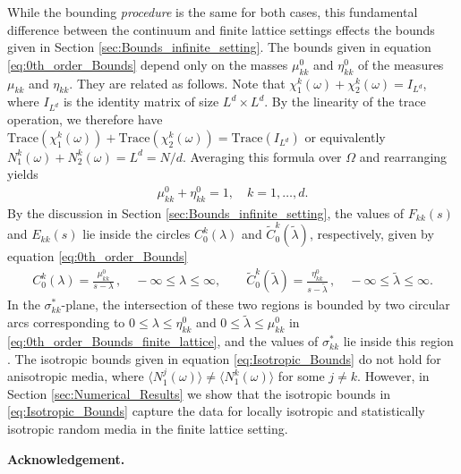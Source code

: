 \documentclass{cmslatex}
\begin{document}
While the bounding \emph{procedure} is the same for both cases, this
fundamental difference between the continuum and finite lattice
settings effects the bounds given in Section
\eqref{sec:Bounds_infinite_setting}. The bounds given in equation
\eqref{eq:0th_order_Bounds} depend only on the masses $\mu_{kk}^0$ and
$\eta_{kk}^0$ of the measures $\mu_{kk}$ and $\eta_{kk}$. They are related as
follows. Note that $\chi_1^k(\omega)+\chi_2^k(\omega)=I_{L^d}$, where $I_{L^d}$ is the
identity matrix of size $L^d\times L^d$. By the linearity of the trace
operation, we therefore have
$\text{Trace}(\chi_1^k(\omega))+\text{Trace}(\chi_2^k(\omega))=\text{Trace}(I_{L^d})$   
or equivalently $N_1^k(\omega)+N_2^k(\omega)=L^d=N/d$. Averaging this formula
over $\Omega$ and rearranging yields
%
\begin{align*}
  \mu_{kk}^0+\eta_{kk}^0=1, \quad  k=1,\ldots,d.
\end{align*}
%
By the discussion in Section \ref{sec:Bounds_infinite_setting}, the
values of $F_{kk}(s)$ and $E_{kk}(s)$ lie inside the circles
$C^k_0(\lambda)$ and $\tilde{C}^k_0(\tilde{\lambda})$, respectively, given by
equation \eqref{eq:0th_order_Bounds}  
%
\begin{align}\label{eq:0th_order_Bounds_finite_lattice}
    C_0^k(\lambda)=\frac{\mu_{kk}^0}{s-\lambda}\,, \quad -\infty\leq\lambda\leq \infty, \qquad
    \tilde{C}^k_0(\tilde{\lambda})=\frac{\eta_{kk}^0}{s-\tilde{\lambda}}\,, \quad
    -\infty\leq\tilde{\lambda}\leq \infty. 
\end{align}
%  
In the $\sigma^*_{kk}$-plane, the intersection of these two regions is bounded by
two circular arcs corresponding to $0\leq\lambda\leq\eta_{kk}^0$ and $0\leq\tilde{\lambda}\leq\mu_{kk}^0$
in \eqref{eq:0th_order_Bounds_finite_lattice}, and the values of
$\sigma^*_{kk}$ lie inside this region \cite{Golden:1986:BCP}. The
isotropic bounds given in equation \eqref{eq:Isotropic_Bounds} do not
hold for anisotropic media, where $\langle N_1^j(\omega)\rangle\neq\langle N_1^k(\omega)\rangle$ for some
$j\neq k$. However, in Section \ref{sec:Numerical_Results} we show that
the isotropic bounds in \eqref{eq:Isotropic_Bounds} capture the data
for locally isotropic and statistically isotropic random media in the
finite lattice setting. 




\medskip

{\bf Acknowledgement.}
\medskip



\end{document}
